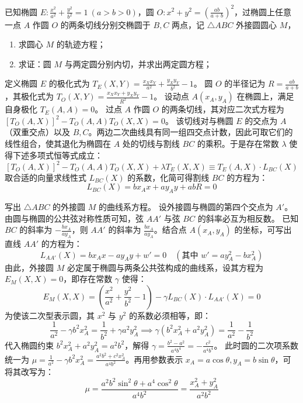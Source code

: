 \begin{exercise}
已知椭圆 \(E: \frac{x^2}{a^2} + \frac{y^2}{b^2} = 1\ (a > b > 0)\)，圆 \(O: x^2 + y^2 = \left(\frac{ab}{a + b}\right)^2\)，过椭圆上任意一点 \(A\) 作圆 \(O\) 的两条切线分别交椭圆于 \(B,C\) 两点，记 \(\triangle ABC\) 外接圆圆心 \(M\)，
\begin{enumerate}
    \item 求圆心 \(M\) 的轨迹方程；
    \item 求证：圆 \(M\) 与两定圆分别内切，并求出两定圆方程；
\end{enumerate}
\end{exercise}
\begin{solution}
定义椭圆 $E$ 的极化式为 $T_E(X,Y) = \frac{x_X x_Y}{a^2} + \frac{y_X y_Y}{b^2} - 1$。
圆 $O$ 的半径记为 $R = \frac{ab}{a+b}$，其极化式为 $T_O(X,Y) = \frac{x_X x_Y + y_X y_Y}{R^2} - 1$。
设动点 $A(x_A, y_A)$ 在椭圆上，满足自身极化 $T_E(A,A) = 0$。
过点 $A$ 作圆 $O$ 的两条切线，其对应二次式方程为 $[T_O(A,X)]^2 - T_O(A,A)T_O(X,X) = 0$。
该切线对与椭圆 $E$ 的交点为 $A$（双重交点）以及 $B, C$。两边二次曲线具有同一组四交点计数，因此可取它们的线性组合，使其退化为椭圆在 $A$ 处的切线与割线 $BC$ 的乘积。于是存在常数 $\lambda$ 使得下述多项式恒等式成立：
$$ [T_O(A,X)]^2 - T_O(A,A)T_O(X,X) + \lambda T_E(X,X) \equiv T_E(A,X) \cdot L_{BC}(X) $$
取合适的向量求线性式 $L_{BC}(X)$ 的系数，化简可得割线 $BC$ 的方程为：
$$ L_{BC}(X) = b x_A x + a y_A y + ab R = 0 $$

写出 $\triangle ABC$ 的外接圆 $M$ 的曲线系方程。
设外接圆与椭圆的第四个交点为 $A'$。由圆与椭圆的公共弦对称性质可知，弦 $AA'$ 与弦 $BC$ 的斜率必互为相反数。
已知 $BC$ 的斜率为 $-\frac{b x_A}{a y_A}$，则 $AA'$ 的斜率为 $\frac{b x_A}{a y_A}$。结合点 $A(x_A, y_A)$ 的坐标，可写出直线 $AA'$ 的方程为：
$$ L_{AA'}(X) = b x_A x - a y_A y + w' = 0 \quad (\text{其中 } w' = a y_A^2 - b x_A^2) $$
由此，外接圆 $M$ 必定属于椭圆与两条公共弦构成的曲线系，设其方程为 $E_M(X,X) = 0$，即存在常数 $\gamma$ 使得：
$$ E_M(X,X) = \left( \frac{x^2}{a^2} + \frac{y^2}{b^2} - 1 \right) - \gamma L_{BC}(X) \cdot L_{AA'}(X) = 0 $$
为使该二次型表示圆，其 $x^2$ 与 $y^2$ 的系数必须相等，即：
$$ \frac{1}{a^2} - \gamma b^2 x_A^2 = \frac{1}{b^2} + \gamma a^2 y_A^2 \implies \gamma(b^2 x_A^2 + a^2 y_A^2) = \frac{1}{a^2} - \frac{1}{b^2} $$
代入椭圆约束 $b^2 x_A^2 + a^2 y_A^2 = a^2 b^2$，解得 $\gamma = \frac{b^2 - a^2}{a^4 b^4} = -\frac{c^2}{a^4 b^4}$。
此时圆的二次项系数统一为 $\mu = \frac{1}{a^2} - \gamma b^2 x_A^2 = \frac{a^2 b^2 + c^2 x_A^2}{a^4 b^2}$。再用参数表示 $x_A = a\cos\theta, y_A = b\sin\theta$，可将其改写为：
$$ \mu = \frac{a^2 b^2 \sin^2\theta + a^4 \cos^2\theta}{a^4 b^2} = \frac{x_A^2 + y_A^2}{a^2 b^2} $$


\end{solution}
